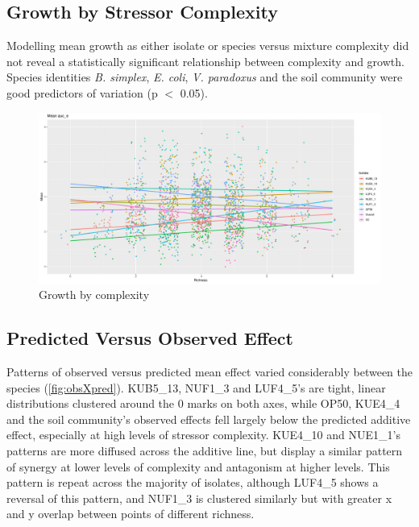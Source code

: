 \documentclass[final,1p,times]{elsarticle}
\begin{document}
\newpage
\subsection{Growth by Stressor Complexity}
\label{S:3:3}

Modelling mean growth as either isolate or species versus mixture complexity did not reveal a statistically significant relationship between complexity and growth. Species identities \textit{B. simplex}, \textit{E. coli}, \textit{V. paradoxus} and the soil community were good predictors of variation (p $<$ 0.05).

\begin{figure}[H]
    \centering
    \includegraphics[width = \textwidth]{Scripts/Results/Final_Pipeline/growthXrichness.pdf}
    \caption{Growth by complexity}
    \label{fig:growthXcomplex}
\end{figure}

\newpage
\subsection{Predicted Versus Observed Effect}
\label{S:3:4}

Patterns of observed versus predicted mean effect varied considerably between the species (\cref{fig:obsXpred}). KUB5\_13, NUF1\_3 and LUF4\_5’s are tight, linear distributions clustered around the 0 marks on both axes, while OP50, KUE4\_4 and the soil community’s observed effects fell largely below the predicted additive effect, especially at high levels of stressor complexity. KUE4\_10 and NUE1\_1’s patterns are more diffused across the additive line, but display a similar pattern of synergy at lower levels of complexity and antagonism at higher levels. This pattern is repeat across the majority of isolates, although LUF4\_5 shows a reversal of this pattern, and NUF1\_3 is clustered similarly but with greater x and y overlap between points of different richness.
\end{document}
